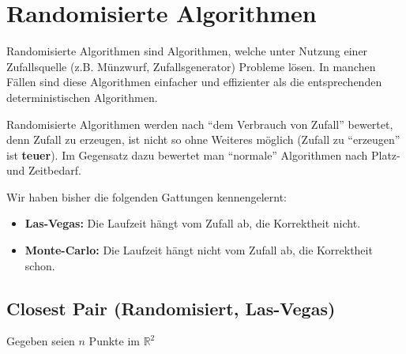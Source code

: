\documentclass{scrartcl}%
\begin{document}
    \section*{Randomisierte Algorithmen}
    \label{sec:randomisierteAlgorithmen}

    Randomisierte Algorithmen sind Algorithmen,
    welche unter Nutzung einer Zufallsquelle (z.B. Münzwurf, Zufallsgenerator) Probleme lösen.
    In manchen Fällen sind diese Algorithmen einfacher und effizienter
    als die entsprechenden deterministischen Algorithmen.

    Randomisierte Algorithmen werden nach "`dem Verbrauch von Zufall"' bewertet,
    denn Zufall zu erzeugen, ist nicht so ohne Weiteres möglich (Zufall zu "`erzeugen"' ist \textbf{teuer}).
    Im Gegensatz dazu bewertet man "`normale"' Algorithmen nach Platz- und Zeitbedarf.

    Wir haben bisher die folgenden Gattungen kennengelernt:

    \begin{itemize}
        \item \textbf{\textsf{Las-Vegas:}} Die Laufzeit hängt vom Zufall ab, die Korrektheit nicht.
        \item \textbf{\textsf{Monte-Carlo:}} Die Laufzeit hängt nicht vom Zufall ab, die Korrektheit schon.
    \end{itemize}

    \subsection*{Closest Pair (Randomisiert, Las-Vegas)}
    \label{subsec:closestPairrandomisiert,LasVegas}

    Gegeben seien $n$ Punkte im $\mathbb{R}^2$

    \begin{figure}[htb]
        \centering

    \end{figure}
\end{document}

